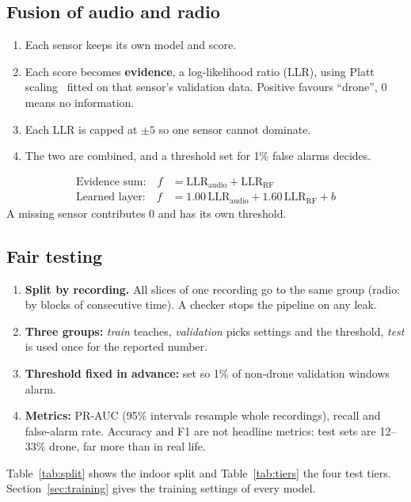 \documentclass[conference,a4paper]{IEEEtran}
\begin{document}
\subsection{Fusion of audio and radio}
\begin{enumerate}
  \item Each sensor keeps its own model and score.
  \item Each score becomes \textbf{evidence}, a log-likelihood ratio (LLR), using Platt
        scaling~\cite{platt} fitted on that sensor's validation data. Positive favours ``drone'',
        0 means no information.
  \item Each LLR is capped at $\pm 5$ so one sensor cannot dominate.
  \item The two are combined, and a threshold set for 1\% false alarms decides.
\end{enumerate}
\begin{align*}
  \text{Evidence sum:}  \quad f &= \mathrm{LLR}_\text{audio} + \mathrm{LLR}_\text{RF}\\
  \text{Learned layer:} \quad f &= 1.00\,\mathrm{LLR}_\text{audio} + 1.60\,\mathrm{LLR}_\text{RF} + b
\end{align*}
A missing sensor contributes 0 and has its own threshold.

\subsection{Fair testing}
\begin{enumerate}
  \item \textbf{Split by recording.} All slices of one recording go to the same group (radio: by
        blocks of consecutive time). A checker stops the pipeline on any leak.
  \item \textbf{Three groups:} \emph{train} teaches, \emph{validation} picks settings and the
        threshold, \emph{test} is used once for the reported number.
  \item \textbf{Threshold fixed in advance:} set so 1\% of non-drone validation windows alarm.
  \item \textbf{Metrics:} PR-AUC (95\% intervals resample whole recordings), recall and
        false-alarm rate. Accuracy and F1 are not headline metrics: test sets are 12--33\% drone,
        far more than in real life.
\end{enumerate}
Table~\ref{tab:split} shows the indoor split and Table~\ref{tab:tiers} the four test tiers.
Section~\ref{sec:training} gives the training settings of every model.
\end{document}
